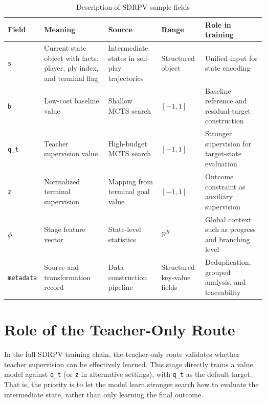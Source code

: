 \begin{table}[htbp]
\centering
\caption{Description of SDRPV sample fields}
\label{tab:sdrpv_sample_fields}
\begin{tabular}{p{1.8cm}p{2.8cm}p{2.5cm}p{2.3cm}p{4.3cm}}
\toprule
Field & Meaning & Source & Range & Role in training \\
\midrule
\texttt{s} & Current state object with facts, player, ply index, and terminal flag & Intermediate states in self-play trajectories & Structured object & Unified input for state encoding \\
\texttt{b} & Low-cost baseline value & Shallow MCTS search & $[-1,1]$ & Baseline reference and residual-target construction \\
\texttt{q\_t} & Teacher supervision value & High-budget MCTS search & $[-1,1]$ & Stronger supervision for target-state evaluation \\
\texttt{z} & Normalized terminal supervision & Mapping from terminal goal value & $[-1,1]$ & Outcome constraint as auxiliary supervision \\
$\phi$ & Stage feature vector & State-level statistics & $\mathbb{R}^{K}$ & Global context such as progress and branching level \\
\texttt{metadata} & Source and transformation record & Data construction pipeline & Structured key-value fields & Deduplication, grouped analysis, and traceability \\
\bottomrule
\end{tabular}
\end{table}

\section{Role of the Teacher-Only Route}
In the full SDRPV training chain, the teacher-only route validates whether teacher supervision can be effectively learned. This stage directly trains a value model against \texttt{q_t} (or \texttt{z} in alternative settings), with \texttt{q_t} as the default target. That is, the priority is to let the model learn stronger search how to evaluate the intermediate state, rather than only learning the final outcome.



